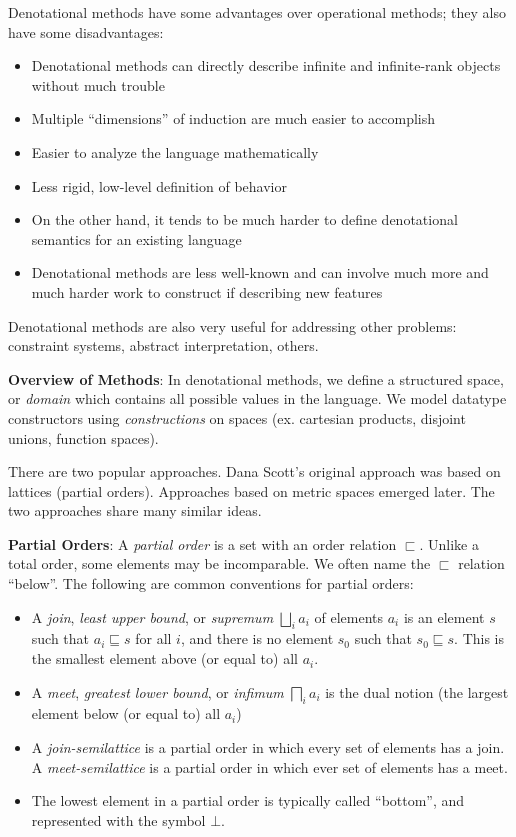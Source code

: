 \documentclass{article}
\begin{document}
Denotational methods have some advantages over operational methods;
they also have some disadvantages:
\begin{itemize}
  \item Denotational methods can directly describe infinite and
    infinite-rank objects without much trouble
  \item Multiple ``dimensions'' of induction are much easier to accomplish
  \item Easier to analyze the language mathematically
  \item Less rigid, low-level definition of behavior
  \item On the other hand, it tends to be much harder to define
    denotational semantics for an existing language
  \item Denotational methods are less well-known and can involve much
    more and much harder work to construct if describing new features
\end{itemize}

Denotational methods are also very useful for addressing other
problems: constraint systems, abstract interpretation, others.

\textbf{Overview of Methods}: In denotational methods, we define a
structured space, or \emph{domain} which contains all possible values
in the language.  We model datatype constructors using
\emph{constructions} on spaces (ex. cartesian products, disjoint
unions, function spaces).

There are two popular approaches.  Dana Scott's original approach was
based on lattices (partial orders).  Approaches based on metric spaces
emerged later.  The two approaches share many similar ideas.

\textbf{Partial Orders}: A \emph{partial order} is a set with an order
relation $\sqsubset$.  Unlike a total order, some elements may be
incomparable.  We often name the $\sqsubset$ relation ``below''.  The
following are common conventions for partial orders:
\begin{itemize}
  \item A \emph{join}, \emph{least upper bound}, or \emph{supremum}
    $\bigsqcup_ia_i$ of elements $a_i$ is an element $s$ such that
    $a_i \sqsubseteq s$ for all $i$, and there is no element $s_0$
    such that $s_0 \sqsubseteq s$.  This is the smallest element above
    (or equal to) all $a_i$.

  \item A \emph{meet}, \emph{greatest lower bound}, or \emph{infimum}
    $\bigsqcap_ia_i$ is the dual notion (the largest element below (or
    equal to) all $a_i$)

  \item A \emph{join-semilattice} is a partial order in which every
    set of elements has a join.  A \emph{meet-semilattice} is a
    partial order in which ever set of elements has a meet.

  \item The lowest element in a partial order is typically called
    ``bottom'', and represented with the symbol $\bot$.
\end{itemize}
\end{document}
